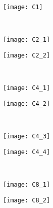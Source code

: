 \begin{figure}[H]
\centering
\begin{minipage}[t]{0.49\textwidth}
	\centering
		\texttt{[image: C1]}
	\end{minipage} \\ \vspace{.25cm} 
	\begin{minipage}[b]{0.49\textwidth}
		\texttt{[image: C2\_1]}
	\end{minipage} \hfill
	\begin{minipage}[b]{0.49\textwidth}
		\texttt{[image: C2\_2]}
	\end{minipage} \\ \vspace{.25cm} 
	\begin{minipage}[b]{0.49\textwidth}
		\texttt{[image: C4\_1]}
	\end{minipage} \hfill
	\begin{minipage}[b][3.1cm]{0.49\textwidth}
		\texttt{[image: C4\_2]}
	\end{minipage} \\ \vspace{-.5cm} 
	\begin{minipage}[b]{0.49\textwidth}
		\texttt{[image: C4\_3]}
		\label{fig:C_4^3}
	\end{minipage} \hfill
	\begin{minipage}[b][5.1cm]{0.49\textwidth}
		\texttt{[image: C4\_4]}
	\end{minipage} \\ \vspace{-1.9cm} 
	\begin{minipage}[b]{0.49\textwidth}
		\texttt{[image: C8\_1]}
	\end{minipage} \hfill
	\begin{minipage}[b][5.1cm]{0.49\textwidth}
		\texttt{[image: C8\_2]}
		\label{fig:C_8^2}
	\end{minipage} \\	\vspace{.5cm} 

\end{figure}
